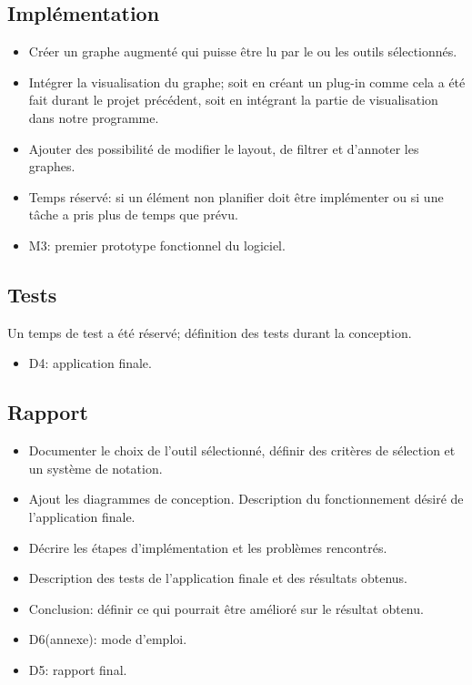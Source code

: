 \documentclass{article}
\begin{document}
  \subsection{Implémentation}
  	\begin{itemize}
  		\item Créer un graphe augmenté qui puisse être lu par le ou les outils sélectionnés.
  		\item Intégrer la visualisation du graphe; soit en créant un plug-in comme cela a été fait durant le projet précédent, soit en intégrant la partie de visualisation dans notre programme.
  		\item Ajouter des possibilité de modifier le layout, de filtrer et d'annoter les graphes.
  		\item Temps réservé: si un élément non planifier doit être implémenter ou si une tâche a pris plus de temps que prévu.
    \item M3: premier prototype fonctionnel du logiciel.
  \end{itemize}
  \subsection{Tests}
  Un temps de test a été réservé; définition des tests durant la conception.
  \begin{itemize}
    \item D4: application finale.
  \end{itemize}
  \subsection{Rapport}
  \begin{itemize}
    \item Documenter le choix de l'outil sélectionné, définir des critères de sélection et un système de notation.
    \item Ajout les diagrammes de conception. Description du fonctionnement désiré de l'application finale.
    \item Décrire les étapes d'implémentation et les problèmes rencontrés.
    \item Description des tests de l'application finale et des résultats obtenus.
    \item Conclusion: définir ce qui pourrait être amélioré sur le résultat obtenu.
    \item D6(annexe): mode d'emploi.
    \item D5: rapport final.
  \end{itemize}
\end{document}
